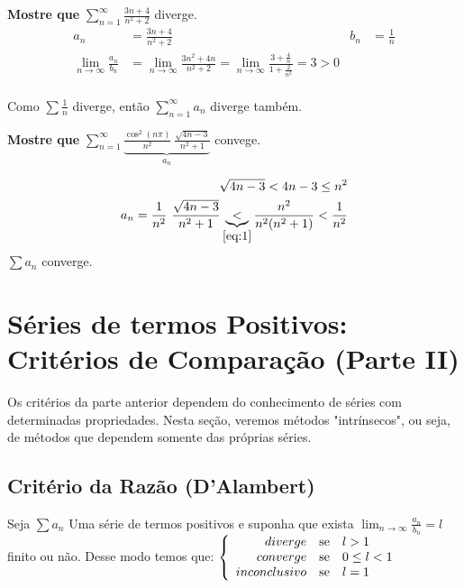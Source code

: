 \documentclass[12pt,openany]{book}
\begin{document}
\hspace{5mm} \textbf{Mostre que} $\displaystyle{\sum_{n=1}^{\infty} \frac{3n + 4}{n^2 + 2}}$ diverge.
\begin{align*}
a_n &= \frac{3n + 4}{n^2 + 2} & b_n &= \frac{1}{n} \\
\lim_{n \rightarrow \infty} \frac{a_n}{b_n} &= \lim_{n \rightarrow \infty} \frac{3n^2 + 4n}{n^2 + 2} = \lim_{n \rightarrow \infty} \frac{3 + \frac{4}{n}}{1 + \frac{2}{n^2}} = 3 > 0 \\
\end{align*}

Como $\sum \frac{1}{n}$ diverge, então $\sum_{n = 1}^{\infty} a_n$ diverge também. \vspace{7mm}

\hspace{5mm} \textbf{Mostre que} $\displaystyle{\sum_{n=1}^{\infty} \underbrace{\frac{\cos^2(n\pi)}{n^2}\ \frac{\sqrt{4n-3}}{n^2+1}}_{a_n}}$ convege.

\begin{align}
\sqrt{4n-3} < 4n-3 \leq n^2 \label{eq:1} \\
a_n = \frac{1}{n^2} \ \frac{\sqrt{4n-3}}{n^2 + 1} \underbrace{<}_{\ref{eq:1}} \frac{n^2}{n^2(n^2+1)} < \frac{1}{n^2} \\
\end{align}
$\sum a_n$ converge.

\section{Séries de termos Positivos: Critérios de Comparação (Parte II)}
\label{sec:s210}

\hspace{5mm}Os critérios da parte anterior dependem do conhecimento de séries com determinadas propriedades. Nesta seção, veremos métodos "intrínsecos", ou seja, de métodos que dependem somente das próprias séries.

\subsection{Critério da Razão (D'Alambert)}
Seja $\sum a_n$ Uma série de termos positivos e suponha que exista $\displaystyle{\lim_{n \rightarrow \infty} \frac{a_n}{b_n} = l}$ finito ou não. Desse modo temos que: $\left\{ \begin{array}{rlll}
diverge & \hbox{se} &  l > 1 \\
converge & \hbox{se} & 0 \leq l < 1 \\
inconclusivo & \hbox{se} & l = 1 \\
\end{array}\right.$
\end{document}
